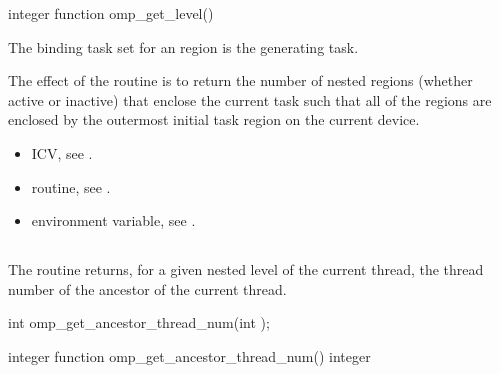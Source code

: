 \begin{fortranspecific}
\begin{ompfFunction}
integer function omp_get_level()
\end{ompfFunction}
\end{fortranspecific}

\binding
The binding task set for an  region is the generating task.

\effect
The effect of the  routine is to return the 
number of nested  regions (whether active or inactive) 
that enclose the current task such that all of the  
regions are enclosed by the outermost initial task region on the current device.

\crossreferences
\begin{itemize}
\item {} ICV, see
.

\item {} routine, see
.

\item {} environment variable, see
.
\end{itemize}



\subsection{}
\label{subsec:omp_get_ancestor_thread_num}
\summary
The  routine returns, for a given nested level 
of the current thread, the thread number of the ancestor of the current thread.

\begin{samepage}
\format
\begin{ccppspecific}
\begin{ompcFunction}
int omp_get_ancestor_thread_num(int );
\end{ompcFunction}
\end{ccppspecific}
\end{samepage}

\begin{fortranspecific}
\begin{ompfFunction}
integer function omp_get_ancestor_thread_num()
integer 
\end{ompfFunction}
\end{fortranspecific}

